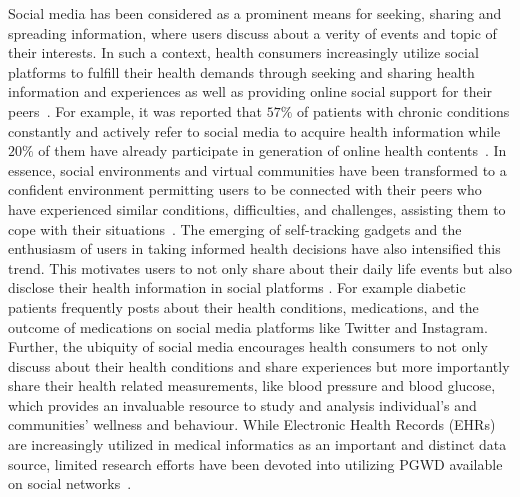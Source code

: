 \documentclass{acm_proc_article-sp}
\begin{document}
Social media has been considered as a prominent means for seeking, sharing and spreading information, where users discuss about a verity of events and topic of their interests. In such a context, health consumers increasingly utilize social platforms to fulfill their health demands through seeking and sharing health information and experiences as well as providing online social support for their peers~\cite{attai2015twitter,de2014seeking,dredze2012social}. For example, it was reported that $57\%$ of patients with chronic conditions constantly and actively refer to social media to acquire health information while $20\%$ of them have already participate in generation of online health contents~\cite{socialmediaandhealth}. In essence, social environments and virtual communities have been transformed to a confident environment permitting users to be connected with their peers who have experienced similar conditions, difficulties, and challenges, assisting them to cope with their situations~\cite{davis2015seeking,greene2011online}. The emerging of self-tracking gadgets and the enthusiasm of users in taking informed health decisions have also intensified this trend. This motivates users to not only share about their daily life events but also disclose their health information in social platforms \cite{de2013predicting}. For example diabetic patients frequently posts about their health conditions, medications, and the outcome of medications on social media platforms like Twitter and Instagram. Further, the ubiquity of social media encourages  health consumers to not only discuss about their health conditions and share experiences but more importantly share their health related measurements, like blood pressure and blood glucose, which provides an invaluable resource to study and analysis individual's and communities' wellness and behaviour. While Electronic Health Records (EHRs) are increasingly utilized in medical informatics as an important and distinct data source, limited research efforts have been devoted into utilizing PGWD available on social networks~\cite{che2015distilling,robinson2012deep,sun2015linkage}.
\end{document}
